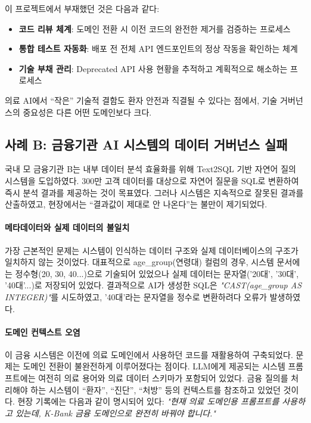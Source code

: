 이 프로젝트에서 부재했던 것은 다음과 같다:
\begin{itemize}
    \item \textbf{코드 리뷰 체계}: 도메인 전환 시 이전 코드의 완전한 제거를 검증하는 프로세스
    \item \textbf{통합 테스트 자동화}: 배포 전 전체 API 엔드포인트의 정상 작동을 확인하는 체계
    \item \textbf{기술 부채 관리}: Deprecated API 사용 현황을 추적하고 계획적으로 해소하는 프로세스
\end{itemize}

의료 AI에서 ``작은'' 기술적 결함도 환자 안전과 직결될 수 있다는 점에서, 기술 거버넌스의 중요성은 다른 어떤 도메인보다 크다.

\subsection{사례 B: 금융기관 AI 시스템의 데이터 거버넌스 실패}
\label{sec:1.3.2}

국내 모 금융기관 B는 내부 데이터 분석 효율화를 위해 Text2SQL 기반 자연어 질의 시스템을 도입하였다. 300만 고객 데이터를 대상으로 자연어 질문을 SQL로 변환하여 즉시 분석 결과를 제공하는 것이 목표였다. 그러나 시스템은 지속적으로 잘못된 결과를 산출하였고, 현장에서는 ``결과값이 제대로 안 나온다''는 불만이 제기되었다.

\paragraph{메타데이터와 실제 데이터의 불일치}
가장 근본적인 문제는 시스템이 인식하는 데이터 구조와 실제 데이터베이스의 구조가 일치하지 않는 것이었다. 대표적으로 age\_group(연령대) 컬럼의 경우, 시스템 문서에는 정수형(20, 30, 40...)으로 기술되어 있었으나 실제 데이터는 문자열('20대', '30대', '40대'...)로 저장되어 있었다. 결과적으로 AI가 생성한 SQL은 \textit{"CAST(age\_group AS INTEGER)"}를 시도하였고, '40대'라는 문자열을 정수로 변환하려다 오류가 발생하였다.

\paragraph{도메인 컨텍스트 오염}
이 금융 시스템은 이전에 의료 도메인에서 사용하던 코드를 재활용하여 구축되었다. 문제는 도메인 전환이 불완전하게 이루어졌다는 점이다. LLM에게 제공되는 시스템 프롬프트에는 여전히 의료 용어와 의료 데이터 스키마가 포함되어 있었다. 금융 질의를 처리해야 하는 시스템이 ``환자'', ``진단'', ``처방'' 등의 컨텍스트를 참조하고 있었던 것이다. 현장 기록에는 다음과 같이 명시되어 있다: \textit{"현재 의료 도메인용 프롬프트를 사용하고 있는데, K-Bank 금융 도메인으로 완전히 바꿔야 합니다."}

